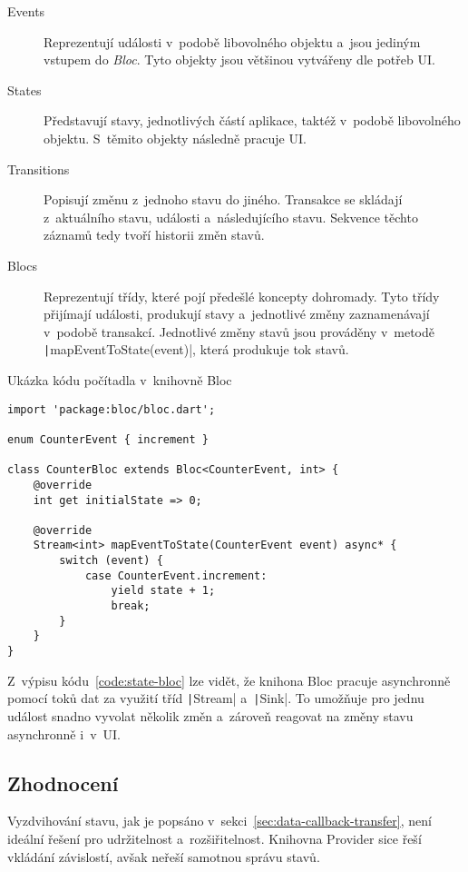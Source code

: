 \begin{description}
    \item[Events] Reprezentují události v~podobě libovolného objektu
    a~jsou jediným vstupem do \emph{Bloc}.
    Tyto objekty jsou většinou vytvářeny dle potřeb UI.
    \item[States] Představují stavy,
    jednotlivých částí aplikace,
    taktéž v~podobě libovolného objektu.
    S~těmito objekty následně pracuje UI.
    \item[Transitions] Popisují změnu z~jednoho stavu do jiného.
    Transakce se skládají z~aktuálního stavu, události a~následujícího stavu.
    Sekvence těchto záznamů tedy tvoří historii změn stavů.
    \item[Blocs] Reprezentují třídy,
    které pojí předešlé koncepty dohromady.
    Tyto třídy přijímají události, produkují stavy a~jednotlivé změny
    zaznamenávají v~podobě transakcí.
    Jednotlivé změny stavů jsou prováděny v~metodě
    \texttt|mapEventToState(event)|,
    která produkuje tok stavů.
\end{description}

\begin{listing}
    \caption{Ukázka kódu počítadla v~knihovně
    Bloc~\cite{bloclibrary_coreconcepts}}
    \label{code:state-bloc}
    \begin{verbatim}
import 'package:bloc/bloc.dart';

enum CounterEvent { increment }

class CounterBloc extends Bloc<CounterEvent, int> {
    @override
    int get initialState => 0;

    @override
    Stream<int> mapEventToState(CounterEvent event) async* {
        switch (event) {
            case CounterEvent.increment:
                yield state + 1;
                break;
        }
    }
}
    \end{verbatim}
\end{listing}

Z~výpisu kódu~\ref{code:state-bloc} lze vidět,
že knihona Bloc pracuje asynchronně pomocí toků dat za využití
tříd \texttt|Stream| a~\texttt|Sink|.
To umožňuje pro jednu událost snadno vyvolat několik změn
a~zároveň reagovat na změny stavu asynchronně i~v~UI.

\subsection{Zhodnocení}

Vyzdvihování stavu,
jak je popsáno v~sekci~\ref{sec:data-callback-transfer},
není ideální řešení pro udržitelnost a~rozšiřitelnost.
Knihovna Provider sice řeší vkládání závislostí,
avšak neřeší samotnou správu stavů.

